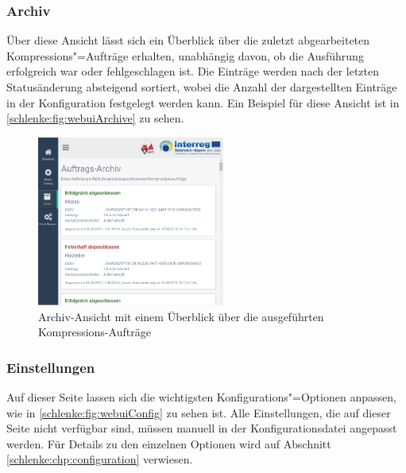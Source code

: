 \subsubsection{Archiv}

Über diese Ansicht lässt sich ein Überblick über die zuletzt abgearbeiteten Kompressions"=Aufträge erhalten, unabhängig davon, ob die Ausführung erfolgreich war oder fehlgeschlagen ist. Die Einträge werden nach der letzten Statusänderung absteigend sortiert, wobei die Anzahl der dargestellten Einträge in der Konfiguration festgelegt werden kann. Ein Beispiel für diese Ansicht ist in \autoref{schlenke:fig:webuiArchive} zu sehen.

\begin{figure}
\begin{center}
\includegraphics[width=0.55\textwidth]{Figures/schlenker/webui/archive.png}
\caption{Archiv-Ansicht mit einem Überblick über die ausgeführten Kompressions-Aufträge}
\label{schlenke:fig:webuiArchive}
\end{center}
\end{figure}

\subsubsection{Einstellungen}

Auf dieser Seite lassen sich die wichtigsten Konfigurations"=Optionen anpassen, wie in \autoref{schlenke:fig:webuiConfig} zu sehen ist. Alle Einstellungen, die auf dieser Seite nicht verfügbar sind, müssen manuell in der Konfigurationsdatei angepasst werden. Für Details zu den einzelnen Optionen wird auf Abschnitt \ref{schlenke:chp:configuration} verwiesen.

